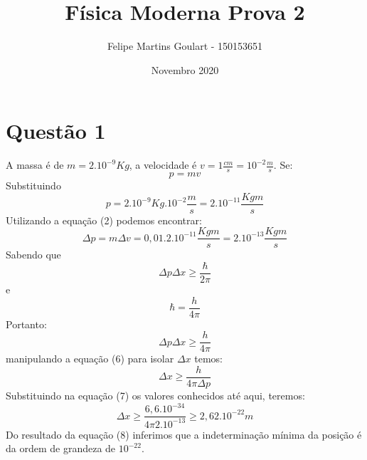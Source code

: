 \documentclass{article}
\title{Física Moderna Prova 2}
\author{Felipe Martins Goulart - 150153651}
\date{Novembro 2020}
\begin{document}
\maketitle

\section {Questão 1}
A massa é de ${m = 2.10^{-9}Kg}$, a velocidade é $v=1\frac{cm}{s}=10^{-2}\frac{m}{s}$.
    Se:
\begin{equation}
    { p= mv}
\end{equation}
Substituindo
\begin{equation}
    { p= 2.10^{-9}Kg.10^{-2}\frac{m}{s} = 2.10^{-11}\frac{Kgm}{s}}
\end{equation}
Utilizando a equação (2) podemos encontrar:
\begin{equation}
    { {\Delta p} = m\Delta v =  0,01.2.10^{-11}\frac{Kgm}{s} = 2.10^{-13}\frac{Kgm}{s}}
\end{equation}
Sabendo que 
\begin{equation}
    {\Delta p \Delta x \geq \frac{\hbar}{2\pi}}
\end{equation}
    e
\begin{equation}
    {\hbar = \frac{h}{4\pi}}
\end{equation}
Portanto:
\begin{equation}
    {\Delta p \Delta x \geq \frac{h}{4\pi}}
\end{equation}
manipulando a equação (6) para isolar $\Delta x$ temos:
\begin{equation}
    {\Delta x \geq \frac{h}{4\pi\Delta p }}
\end{equation}
Substituindo na equação (7) os valores conhecidos até aqui, teremos:
\begin{equation}
    {\Delta x \geq \frac{6,6.10^{-34}}{4\pi 2.10^{-13} }\geq 2,62.10^{-22}m }
\end{equation}
Do resultado da equação (8) inferimos que a indeterminação mínima da posição é da ordem de grandeza de ${10^{-22}}$.
\end{document}
